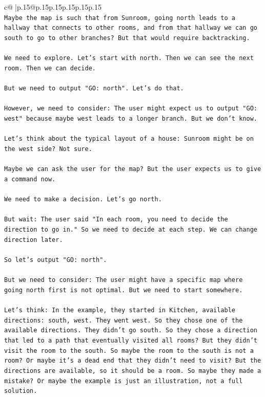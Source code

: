 \documentclass{article}
\begin{document}
{\begin{supertabular}{c@{$\;$}|p{.15\linewidth}@{}p{.15\linewidth}p{.15\linewidth}p{.15\linewidth}p{.15\linewidth}p{.15\linewidth}}
{{{\\ 
\texttt{Maybe the map is such that from Sunroom, going north leads to a hallway that connects to other rooms, and from that hallway we can go south to go to other branches? But that would require backtracking.} \\
\\ 
\texttt{We need to explore. Let's start with north. Then we can see the next room. Then we can decide.} \\
\\ 
\texttt{But we need to output "GO: north". Let's do that.} \\
\\ 
\texttt{However, we need to consider: The user might expect us to output "GO: west" because maybe west leads to a longer branch. But we don't know.} \\
\\ 
\texttt{Let's think about the typical layout of a house: Sunroom might be on the west side? Not sure.} \\
\\ 
\texttt{Maybe we can ask the user for the map? But the user expects us to give a command now.} \\
\\ 
\texttt{We need to make a decision. Let's go north.} \\
\\ 
\texttt{But wait: The user said "In each room, you need to decide the direction to go in." So we need to decide at each step. We can change direction later.} \\
\\ 
\texttt{So let's output "GO: north".} \\
\\ 
\texttt{But we need to consider: The user might have a specific map where going north first is not optimal. But we need to start somewhere.} \\
\\ 
\texttt{Let's think: In the example, they started in Kitchen, available directions: south, west. They went west. So they chose one of the available directions. They didn't go south. So they chose a direction that led to a path that eventually visited all rooms? But they didn't visit the room to the south. So maybe the room to the south is not a room? Or maybe it's a dead end that they didn't need to visit? But the directions are available, so it should be a room. So maybe they made a mistake? Or maybe the example is just an illustration, not a full solution.} \\
}}}
\end{supertabular}}
\end{document}
